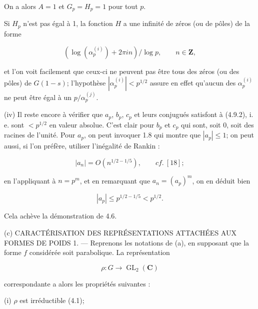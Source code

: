 \documentclass[10pt,oneside]{article}
\begin{document}
On a alors \(A=1\) et \(G_p=H_p=1\) pour tout \(p\).\par

Si \(H_p\) n'est pas égal à 1, la fonction \(H\) a une infinité de zéros (ou de pôles) de la forme\par

\begin{equation*}
(\log(\alpha_p^{(i)})+2\pi in)/\log p,
\qquad n\in\mathbf{Z},
\end{equation*}

et l'on voit facilement que ceux-ci ne peuvent pas être tous des zéros (ou des pôles) de \(G(1-s)\); l'hypothèse \(|\alpha_p^{(i)}|<p^{1/2}\) assure en effet qu'aucun des \(\alpha_p^{(i)}\) ne peut être égal à un \(p/\alpha_p^{(j)}\).\par

(iv) Il reste encore à vérifier que \(a_p\), \(b_p\), \(c_p\) et leurs conjugués satisfont à (4.9.2), i. e. sont \(<p^{1/2}\) en valeur absolue. C'est clair pour \(b_p\) et \(c_p\) qui sont, soit 0, soit des racines de l'unité. Pour \(a_p\), on peut invoquer 1.8 qui montre que \(|a_p|\leq 1\); on peut aussi, si l'on préfère, utiliser l'inégalité de Rankin :\par

\begin{equation*}
|a_n|=O(n^{1/2-1/5}),\qquad cf.\ [18];
\end{equation*}

en l'appliquant à \(n=p^m\), et en remarquant que \(a_n=(a_p)^m\), on en déduit bien\par

\begin{equation*}
|a_p|\leq p^{1/2-1/5}<p^{1/2}.
\end{equation*}

Cela achève la démonstration de 4.6.\par

(c) CARACTÉRISATION DES REPRÉSENTATIONS ATTACHÉES AUX FORMES DE POIDS 1. — Reprenons les notations de (a), en supposant que la forme \(f\) considérée soit parabolique. La représentation\par

\begin{equation*}
\rho:G\longrightarrow\operatorname{GL}_2(\mathbf{C})
\end{equation*}

correspondante a alors les propriétés suivantes :\par

(i) \(\rho\) est irréductible (4.1);\par
\end{document}
